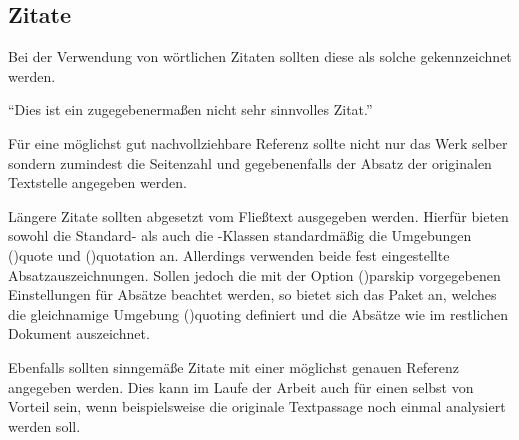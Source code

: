 \documentclass[%
  english,ngerman,%
  cdgeometry=no,DIV=12,%
  cd=false,cdfont=false,cdtitle=true,%
  headings=normal,%
  automark,%
  listof=toc,%
]{tudscrartcl}
\begin{document}
\begin{refsection}
\begin{Trunk+}
\section{Zitate}

Bei der Verwendung von wörtlichen Zitaten sollten diese als solche 
gekennzeichnet werden.
\end{Trunk+}
\begin{Trunk*}
\enquote{Dies ist ein zugegebenermaßen nicht sehr sinnvolles Zitat.}
\cite[58]{hanisch14}
\end{Trunk*}
\begin{Trunk+}
Für eine möglichst gut nachvollziehbare Referenz sollte nicht nur 
das Werk selber sondern zumindest die Seitenzahl und gegebenenfalls 
der Absatz der originalen Textstelle angegeben werden. 
\end{Trunk+}
%
Längere Zitate sollten abgesetzt vom Fließtext ausgegeben werden. Hierfür 
bieten sowohl die Standard- als auch die \KOMAScript-Klassen standardmäßig 
die Umgebungen \Environment(){quote} und 
\Environment(){quotation} an. Allerdings verwenden beide 
fest eingestellte Absatzauszeichnungen. Sollen jedoch die mit der Option 
\Option(){parskip} vorgegebenen Einstellungen für Absätze 
beachtet werden, so bietet sich das Paket  an, welches die 
gleichnamige Umgebung \Environment(){quoting} definiert und 
die Absätze wie im restlichen Dokument auszeichnet.
%
\begin{Preamble}
\usepackage{quoting}

\end{Preamble}
%
\begin{Trunk*}
\end{Trunk*}
\begin{Trunk+}
Ebenfalls sollten sinngemäße Zitate mit einer möglichst genauen Referenz 
angegeben werden. Dies kann im Laufe der Arbeit auch für einen selbst von 
Vorteil sein, wenn beispielsweise die originale Textpassage noch einmal 
analysiert werden soll.

\end{Trunk+}
\begin{quoting}[rightmargin=0pt]
\makeatletter
\let\markboth\@gobbletwo
\let\markright\@gobble
\makeatother
\printbibliography
\end{quoting}
\end{refsection}
\end{document}
